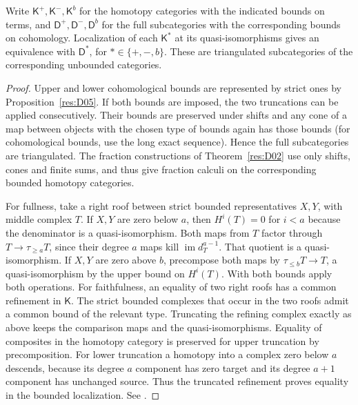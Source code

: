 \begin{proposition}\label{res:D06}
Write \(\mathsf K^+,\mathsf K^-,\mathsf K^b\) for the homotopy
categories with the indicated bounds on terms, and
\(\mathsf D^+,\mathsf D^-,\mathsf D^b\) for the full subcategories
with the corresponding bounds on cohomology. Localization of each
\(\mathsf K^\ast\) at its quasi-isomorphisms gives an equivalence
with \(\mathsf D^\ast\), for \(\ast\in\{+,-,b\}\). These are
triangulated subcategories of the corresponding unbounded
categories.
\end{proposition}
\begin{proof}
Upper and lower cohomological bounds are represented by strict ones
by Proposition~\ref{res:D05}. If both bounds are imposed, the two
truncations can be applied consecutively. Their bounds are preserved
under shifts and any cone of a map between objects with the chosen
type of bounds again has those bounds (for cohomological bounds,
use the long exact sequence). Hence the full subcategories are
triangulated. The fraction constructions of Theorem~\ref{res:D02}
use only shifts, cones and finite sums, and thus give fraction
calculi on the corresponding bounded homotopy categories.

For fullness, take a right roof between strict bounded representatives
\(X,Y\), with middle complex \(T\). If \(X,Y\) are zero below \(a\),
then \(H^i(T)=0\) for \(i<a\) because the denominator is a
quasi-isomorphism. Both maps from \(T\) factor through
\(T\to\tau_{\ge a}T\), since their degree \(a\) maps kill
\(\operatorname{im}d_T^{a-1}\). That quotient is a quasi-isomorphism.
If \(X,Y\) are zero above \(b\), precompose both maps by
\(\tau_{\le b}T\to T\), a quasi-isomorphism by the upper bound on
\(H^i(T)\). With both bounds apply both operations. For faithfulness,
an equality of two right roofs has a common refinement in
\(\mathsf K\). The strict bounded complexes that occur in the two
roofs admit a common bound of the relevant type. Truncating the
refining complex exactly as above keeps the comparison maps and
the quasi-isomorphisms. Equality of composites in the homotopy
category is preserved for upper truncation by precomposition.
For lower truncation a homotopy into a complex zero below \(a\)
descends, because its degree \(a\) component has zero target and
its degree \(a+1\) component has unchanged source. Thus the
truncated refinement proves equality in the bounded localization.
See \cite[Tags 05RQ, 05RV, and 05RW]{stacks-derived}.
\end{proof}

